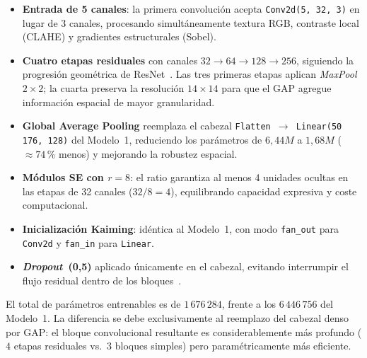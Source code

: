 \begin{itemize}
  \item \textbf{Entrada de 5 canales}: la primera convolución acepta
        \texttt{Conv2d(5,\,32,\,3)} en lugar de 3 canales, procesando
        simultáneamente textura RGB, contraste local (CLAHE) y
        gradientes estructurales (Sobel).
  \item \textbf{Cuatro etapas residuales} con canales
        $32{\to}64{\to}128{\to}256$, siguiendo la progresión
        geométrica de ResNet~\cite{he2016resnet}.
        Las tres primeras etapas aplican
        \textit{MaxPool}~$2{\times}2$; la cuarta preserva la
        resolución $14{\times}14$ para que el GAP agregue
        información espacial de mayor granularidad.
  \item \textbf{Global Average Pooling} reemplaza el cabezal
        \texttt{Flatten\,$\to$\,Linear(50\,176,\,128)} del Modelo~1,
        reduciendo los parámetros de $6{,}44M$ a $1{,}68M$
        (${\approx}74$\,\% menos) y mejorando la robustez espacial.
  \item \textbf{Módulos SE con $r{=}8$}: el ratio garantiza al menos
        4 unidades ocultas en las etapas de 32 canales
        ($32/8{=}4$), equilibrando capacidad expresiva y coste
        computacional.
  \item \textbf{Inicialización Kaiming}: idéntica al Modelo~1,
        con modo \texttt{fan\_out} para \texttt{Conv2d} y
        \texttt{fan\_in} para \texttt{Linear}.
  \item \textbf{\textit{Dropout}~(0{,}5)} aplicado únicamente en el
        cabezal, evitando interrumpir el flujo residual dentro de
        los bloques~\cite{he2016resnet}.
\end{itemize}

El total de parámetros entrenables es de $1\,676\,284$, frente a
los $6\,446\,756$ del Modelo~1. La diferencia se debe
exclusivamente al reemplazo del cabezal denso por GAP: el bloque
convolucional resultante es considerablemente más profundo
($4$ etapas residuales vs.\ $3$ bloques simples) pero
paramé\-tricamente más eficiente.
